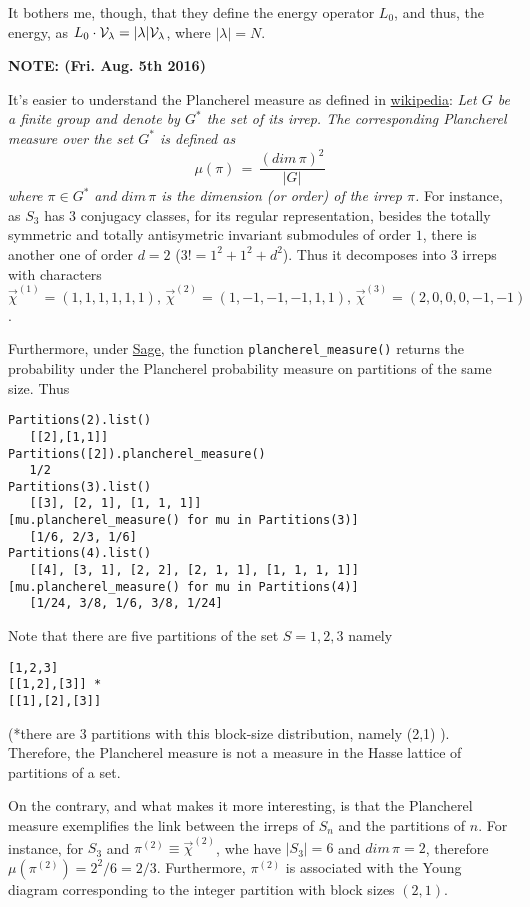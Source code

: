 \documentclass[twocolumn,aps,sort,nofootinbib]{revtex4}
\newcommand{\link}[2][url]{\href{#2}{#1}}
\begin{document}
It bothers me, though, that they define the energy operator $L_0$, and thus,
the energy, as $L_0\cdot{\cal V}_\lambda=|\lambda|{\cal V}_\lambda$, where
$|\lambda|=N$. 

{\bfseries NOTE: (Fri. Aug. 5th 2016)}

It's easier to understand the Plancherel measure as defined in \link[wikipedia]{https://en.wikipedia.org/wiki/Plancherel_measure}:
{\it Let $G$ be a finite group and denote by $G^*$ the set of its irrep. 
The corresponding Plancherel measure over the set $G^*$ is defined as
\begin{equation}
\mu(\pi)\,=\,\frac{(dim\,\pi)^2}{|G|}
\label{PlancherelMeasure}
\end{equation}
where $\pi\in G^*$ and $dim\,\pi$ is the dimension (or order) of the irrep $\pi$.
}
For instance, as $S_3$ has $3$ conjugacy classes, for its regular representation, besides the totally symmetric and totally antisymetric
invariant submodules of order $1$, there is another one of order $d=2$ ($3! = 1^2 + 1^2 + d^2$). Thus it decomposes into 3 irreps with characters
$\vec{\chi}^{(1)}=(1,1,1,1,1,1),\,
\vec{\chi}^{(2)}=(1,-1,-1,-1,1,1),\,
\vec{\chi}^{(3)}=(2,0,0,0,-1,-1)
$.

Furthermore, under \link[Sage]{http://www.sagemath.org/}, the function \verb|plancherel_measure()| 
returns the probability under the Plancherel probability measure on partitions of the same size. Thus 
\begin{verbatim}
Partitions(2).list()
   [[2],[1,1]]
Partitions([2]).plancherel_measure()
   1/2
Partitions(3).list()
   [[3], [2, 1], [1, 1, 1]]
[mu.plancherel_measure() for mu in Partitions(3)]
   [1/6, 2/3, 1/6]
Partitions(4).list()
   [[4], [3, 1], [2, 2], [2, 1, 1], [1, 1, 1, 1]]
[mu.plancherel_measure() for mu in Partitions(4)]
   [1/24, 3/8, 1/6, 3/8, 1/24]
\end{verbatim}
Note that there are five partitions of the set $S={1,2,3}$ namely
\begin{verbatim}
[1,2,3] 
[[1,2],[3]] *
[[1],[2],[3]]
\end{verbatim}
(*there are $3$ partitions with this block-size distribution, namely (2,1) ). Therefore, the Plancherel measure
is not a measure in the Hasse lattice of partitions of a set.

On the contrary, and what makes it more interesting, is that the Plancherel measure exemplifies the link between the irreps of $S_n$ and
the partitions of $n$. For instance, for $S_3$ and $\pi^{(2)}\equiv\vec{\chi}^{(2)}$, whe have $|S_3|=6$ and $dim\, \pi=2$,
therefore $\mu(\pi^{(2)})=2^2/6=2/3$. Furthermore, $\pi^{(2)}$ is associated with the Young diagram corresponding to the integer partition
with block sizes $(2,1)$.
\end{document}
